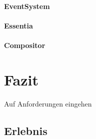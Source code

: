 \documentclass[11pt,a4paper]{article}
\begin{document}
\paragraph{EventSystem}
\paragraph{Essentia}
\paragraph{Compositor}

\section{Fazit}
Auf Anforderungen eingehen
\subsection{Erlebnis}

\newpage




\listoftables
\listoffigures
\end{document}
